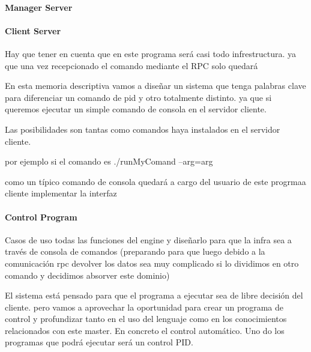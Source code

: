 \paragraph{Manager Server}
    
\paragraph{Client Server}

Hay que tener en cuenta que en este programa será casi todo infrestructura. ya que una vez recepcionado el comando mediante el RPC
solo quedará

En esta memoria descriptiva vamos a diseñar un sistema que tenga palabras clave para diferenciar un comando de pid y otro totalmente distinto. ya que si queremos ejecutar un simple comando de consola en el servidor cliente.

Las posibilidades son tantas como comandos haya instalados en el servidor cliente.

por ejemplo si el comando es ./runMyComand --arg=arg

como un típico comando de consola quedará a cargo del usuario de este progrmaa cliente implementar la interfaz

\paragraph{Control Program}

Casos de uso todas las funciones del engine y diseñarlo para que la infra sea a través de consola de comandos (preparando para que luego debido a la comunicación rpc devolver los datos sea muy complicado si lo dividimos en otro comando y decidimos absorver este dominio)

El sistema está pensado para que el programa a ejecutar sea de libre decisión del cliente. pero vamos a aprovechar la oportunidad para crear un programa de control y profundizar tanto en el uso del lenguaje como en los conocimientos relacionados con este master. En concreto el control automático. Uno do los programas que podrá ejecutar será un control PID.